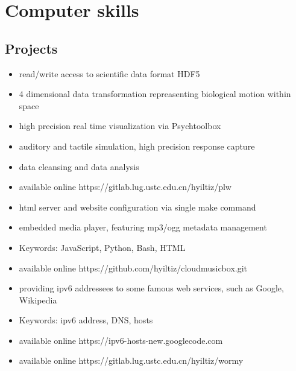 \section{Computer skills}

\subsection{Projects}
  \begin{itemize}%
  \item read/write access to scientific data format HDF5
  \item 4 dimensional data transformation repreasenting biological motion within space
  \item high precision real time visualization via Psychtoolbox
  \item auditory and tactile simulation, high precision response capture
  \item data cleansing and data analysis
  \item available online https://gitlab.lug.ustc.edu.cn/hyiltiz/plw
  \end{itemize}

  \begin{itemize}%
  \item html server and website configuration via single make command
  \item embedded media player, featuring mp3/ogg metadata management
  \item Keywords: JavaScript, Python, Bash, HTML
  \item available online https://github.com/hyiltiz/cloudmusicbox.git
  \end{itemize}

  \begin{itemize}%
  \item providing ipv6 addressees to some famous web services, such as Google, Wikipedia
  \item Keywords: ipv6 address, DNS, hosts
  \item available online https://ipv6-hosts-new.googlecode.com
  \end{itemize}

  \begin{itemize}%
  \item available online https://gitlab.lug.ustc.edu.cn/hyiltiz/wormy
  \end{itemize}
